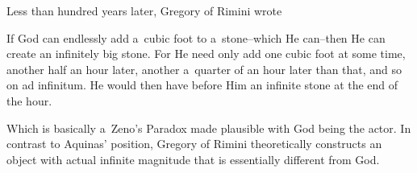 Less than hundred years later, Gregory of Rimini wrote
\begin{displayquote}
If God can endlessly add a~cubic foot to a~stone–which He can–then He can create an infinitely big stone. For He need only add one cubic foot at some time, another half an hour later, another a~quarter of an hour later than that, and so on ad infinitum. He would then have before Him an infinite stone at the end of the hour.
\end{displayquote}
Which is basically a~Zeno's Paradox made plausible with God being the actor. In contrast to Aquinas' position, Gregory of Rimini theoretically constructs an object with actual infinite magnitude that is essentially different from God.

\

